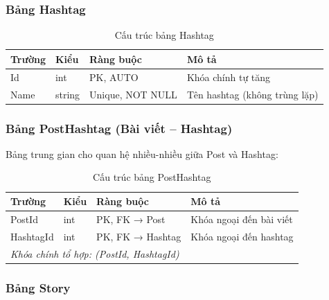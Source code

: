 \documentclass[a4paper]{article}
\begin{document}
\subsubsection{Bảng Hashtag}

\begin{table}[h!]
\centering
\caption{Cấu trúc bảng Hashtag}
\begin{tabularx}{\textwidth}{|l|l|l|X|}
\hline
\textbf{Trường} & \textbf{Kiểu} & \textbf{Ràng buộc} & \textbf{Mô tả} \\
\hline
Id & int & PK, AUTO & Khóa chính tự tăng \\
\hline
Name & string & Unique, NOT NULL & Tên hashtag (không trùng lặp) \\
\hline
\end{tabularx}
\end{table}

\subsubsection{Bảng PostHashtag (Bài viết -- Hashtag)}

Bảng trung gian cho quan hệ nhiều-nhiều giữa Post và Hashtag:

\begin{table}[h!]
\centering
\caption{Cấu trúc bảng PostHashtag}
\begin{tabularx}{\textwidth}{|l|l|l|X|}
\hline
\textbf{Trường} & \textbf{Kiểu} & \textbf{Ràng buộc} & \textbf{Mô tả} \\
\hline
PostId & int & PK, FK → Post & Khóa ngoại đến bài viết \\
\hline
HashtagId & int & PK, FK → Hashtag & Khóa ngoại đến hashtag \\
\hline
\multicolumn{4}{|l|}{\textit{Khóa chính tổ hợp: (PostId, HashtagId)}} \\
\hline
\end{tabularx}
\end{table}

\subsubsection{Bảng Story}
\end{document}
